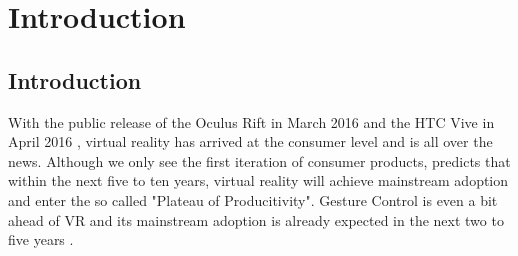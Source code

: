 
\chapter{Introduction} %

\label{ChapterIntroduction} %


\section{Introduction}

With the public release of the Oculus Rift in March 2016 \citep{Oculus2016} and the HTC Vive in April 2016 \citep{Htcvive2016}, virtual reality has arrived at the consumer level and is all over the news. Although we only see the first iteration of consumer products, \cite{Gartner2015} predicts that within the next five to ten years, virtual reality will achieve mainstream adoption and enter the so called "Plateau of Producitivity". Gesture Control is even a bit ahead of VR and its mainstream adoption is already expected in the next two to five years \citep{Gartner2015}.



